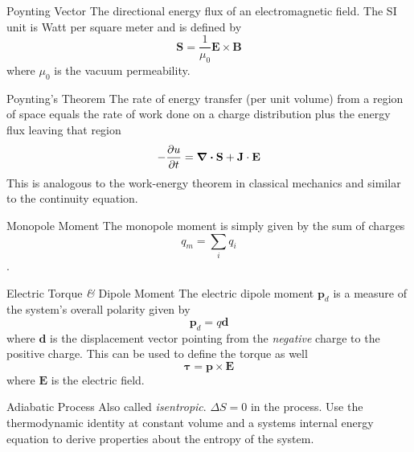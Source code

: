 \documentclass[avery5371,grid]{flashcards}
\begin{document}
\begin{flashcard}[Definition]{Poynting Vector}
	The directional energy flux of an electromagnetic field. The SI unit is Watt per square meter and is defined by
	\begin{equation*}
		\mathbf{S} = \frac{1}{\mu_0}\mathbf{E}\times\mathbf{B}
	\end{equation*}
	where $\mu_0$ is the vacuum permeability.
\end{flashcard}

\begin{flashcard}[Theory]{Poynting's Theorem}
	The rate of energy transfer (per unit volume) from a region of space equals the rate of work done on a charge distribution plus the energy flux leaving that region
	\begin{align*}
		-\pdv{u}{t} = \div\mathbf{S} + \mathbf{J}\cdot \mathbf{E}
	\end{align*}
	This is analogous to the work-energy theorem in classical mechanics and similar to the continuity equation.
\end{flashcard}

\begin{flashcard}[Definition]{Monopole Moment}
	The monopole moment is simply given by the sum of charges $$q_m = \sum_i q_i$$.
\end{flashcard}

\begin{flashcard}[Definition]{Electric Torque \textit{\&} Dipole Moment}
	The electric dipole moment $\mathbf{p}_d$ is a measure of the system's overall polarity given by
	\begin{equation*}
		\mathbf{p}_d = q \mathbf{d}
	\end{equation*}
	where $\mathbf{d}$ is the displacement vector pointing from the \textit{negative} charge to the positive charge. This can be used to define the torque as well
	\begin{equation*}
		\boldsymbol{\tau} = \mathbf{p}\times\mathbf{E}
	\end{equation*}
	where $\mathbf{E}$ is the electric field.
\end{flashcard}



\begin{flashcard}[Theory]{Adiabatic Process}
	Also called \emph{isentropic}. ${\Delta} S = 0$ in the process. Use the
	thermodynamic identity at constant volume and a systems internal energy
	equation to derive properties about the entropy of the system.
\end{flashcard}
\end{document}

